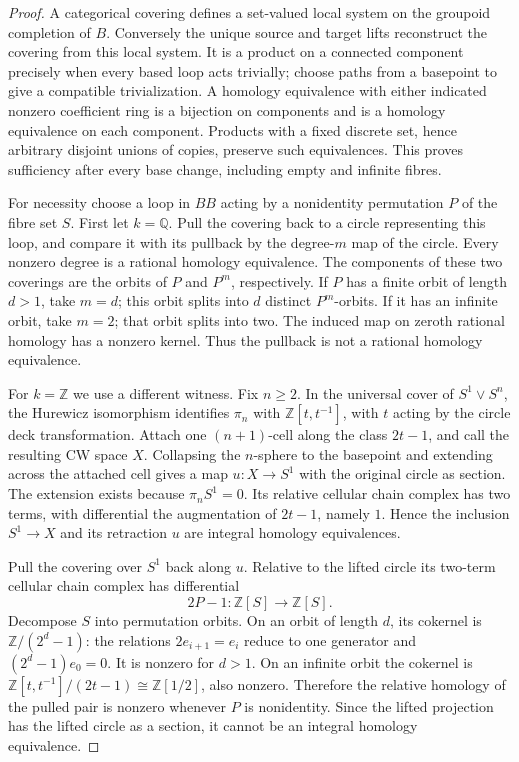 \begin{proof}
A categorical covering defines a set-valued local system on the groupoid completion of $B$. Conversely the unique source and target lifts reconstruct the covering from this local system. It is a product on a connected component precisely when every based loop acts trivially; choose paths from a basepoint to give a compatible trivialization. A homology equivalence with either indicated nonzero coefficient ring is a bijection on components and is a homology equivalence on each component. Products with a fixed discrete set, hence arbitrary disjoint unions of copies, preserve such equivalences. This proves sufficiency after every base change, including empty and infinite fibres.

For necessity choose a loop in $BB$ acting by a nonidentity permutation $P$ of the fibre set $S$. First let $k=\mathbb Q$. Pull the covering back to a circle representing this loop, and compare it with its pullback by the degree-$m$ map of the circle. Every nonzero degree is a rational homology equivalence. The components of these two coverings are the orbits of $P$ and $P^m$, respectively. If $P$ has a finite orbit of length $d>1$, take $m=d$; this orbit splits into $d$ distinct $P^m$-orbits. If it has an infinite orbit, take $m=2$; that orbit splits into two. The induced map on zeroth rational homology has a nonzero kernel. Thus the pullback is not a rational homology equivalence.

For $k=\mathbb Z$ we use a different witness. Fix $n\geq2$. In the universal cover of $S^1\vee S^n$, the Hurewicz isomorphism identifies $\pi_n$ with $\mathbb Z[t,t^{-1}]$, with $t$ acting by the circle deck transformation. Attach one $(n+1)$-cell along the class $2t-1$, and call the resulting CW space $X$. Collapsing the $n$-sphere to the basepoint and extending across the attached cell gives a map $u:X\to S^1$ with the original circle as section. The extension exists because $\pi_nS^1=0$. Its relative cellular chain complex has two terms, with differential the augmentation of $2t-1$, namely $1$. Hence the inclusion $S^1\to X$ and its retraction $u$ are integral homology equivalences.

Pull the covering over $S^1$ back along $u$. Relative to the lifted circle its two-term cellular chain complex has differential
\[
 2P-1:\mathbb Z[S]\longrightarrow\mathbb Z[S].
\]
Decompose $S$ into permutation orbits. On an orbit of length $d$, its cokernel is $\mathbb Z/(2^d-1)$: the relations $2e_{i+1}=e_i$ reduce to one generator and $(2^d-1)e_0=0$. It is nonzero for $d>1$. On an infinite orbit the cokernel is
$\mathbb Z[t,t^{-1}]/(2t-1)\cong\mathbb Z[1/2]$, also nonzero. Therefore the relative homology of the pulled pair is nonzero whenever $P$ is nonidentity. Since the lifted projection has the lifted circle as a section, it cannot be an integral homology equivalence.


\end{proof}
